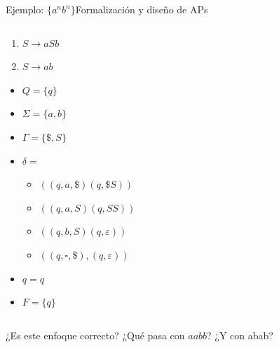 \documentclass[spanish]{beamer}
\begin{document}
\begin{frame}{Ejemplo: $\{a^nb^n\}$}{Formalización y diseño de APs}

    \begin{columns}
        \begin{column}{0.4\textwidth}
            \begin{enumerate}
                \item $S \to aSb$
                \item $S \to ab$
            \end{enumerate}

            \begin{itemize}
                \item $Q = \{q\}$
                \item $\Sigma = \{a, b\}$
                \item $\Gamma = \{\$, S\}$
                \item $\delta =$
                \begin{itemize}
                    \item $((q,a,\$)(q,\$S))$
                    \item $((q,a,S)(q,SS))$
                    \item $((q,b,S)(q,\varepsilon))$
                    \item $((q,\square,\$),(q,\varepsilon))$
                \end{itemize}
                \item $q = q$
                \item $F = \{q\}$
            \end{itemize}
        \end{column}
        \begin{column}{0.6\textwidth}
            \begin{center}
            \end{center}
        \end{column}
    \end{columns}
    
    \bigskip

    ¿Es este enfoque correcto? \pause
    ¿Qué pasa con $aabb$? \pause
    ¿Y con abab? 
\end{frame}
\end{document}
